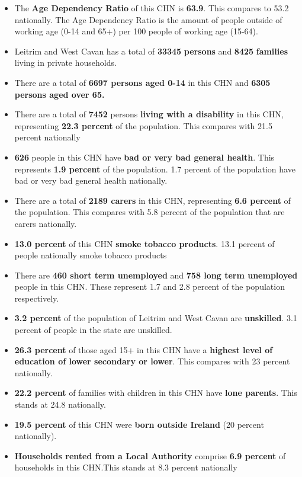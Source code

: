 \documentclass{article}
\begin{document}
\begin{itemize}

\item The \textbf{Age Dependency Ratio} of this CHN is  \textbf{63.9}. This compares to 53.2 nationally. The Age Dependency Ratio is the amount of people outside of working age (0-14 and 65+) per 100 people of working age (15-64). 

\item Leitrim and West Cavan has a total of \textbf{\num{33345}} \textbf{persons} and  \textbf{\num{8425}} \textbf{families} living in private households.

\item There are a total of \textbf{\num{6697} persons aged 0-14} in this CHN and \textbf{\num{6305} persons aged over 65.} 

\item There are a total of \textbf{\num{7452}} persons \textbf{living with a disability} in this CHN, representing \textbf{22.3 percent} of the population. This compares with  21.5 percent nationally

\item \textbf{\num{626}} people in this CHN have \textbf{bad or very bad general health}. This represents \textbf{1.9 percent} of the population. 1.7 percent of the population have bad or very bad general health nationally. 

\item There are a total of \textbf{\num{2189} carers} in this CHN, representing \textbf{6.6 percent} of the population. This compares with 5.8 percent of the population that are carers nationally. 

\item \textbf{13.0 percent} of this CHN \textbf{smoke tobacco products}. 13.1 percent of people nationally smoke tobacco products

\item There are \textbf{\num{460} short term unemployed} and \textbf{\num{758} long term unemployed} people in this CHN. These represent 1.7 and 2.8 percent of the population respectively.

\item  \textbf{3.2 percent} of the population of Leitrim and West Cavan are \textbf{unskilled}. 3.1 percent of people in the state are unskilled.

\item \textbf{26.3 percent} of those aged 15+ in this CHN have a \textbf{highest level of education of lower secondary or lower}. This compares with 23 percent nationally. 

\item \textbf{22.2 percent} of families with children in this CHN have \textbf{lone parents}. This stands at 24.8 nationally.

\item \textbf{19.5 percent} of this CHN were \textbf{born outside Ireland} (20 percent nationally).

\item \textbf{Households rented from a Local Authority} comprise \textbf{6.9 percent} of households in this CHN.This stands at 8.3 percent nationally

\end{itemize}
\end{document}
